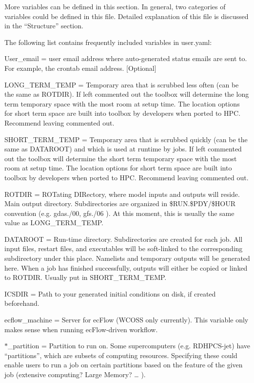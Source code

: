 More variables can be defined in this section. In general, two categories of variables could be defined in this file. Detailed explanation of this file is discussed in the “\-Structure” section.

The following list contains frequently included variables in user.\-yaml\-:


\begin{DoxyItemize}
\item User\-\_\-email = user email address where auto-\/generated status emails are sent to. For example, the crontab email address. \mbox{[}Optional\mbox{]}
\item L\-O\-N\-G\-\_\-\-T\-E\-R\-M\-\_\-\-T\-E\-M\-P = Temporary area that is scrubbed less often (can be the same as R\-O\-T\-D\-I\-R). If left commented out the toolbox will determine the long term temporary space with the most room at setup time. The location options for short term space are built into toolbox by developers when ported to H\-P\-C. Recommend leaving commented out.
\item S\-H\-O\-R\-T\-\_\-\-T\-E\-R\-M\-\_\-\-T\-E\-M\-P = Temporary area that is scrubbed quickly (can be the same as D\-A\-T\-A\-R\-O\-O\-T) and which is used at runtime by jobs. If left commented out the toolbox will determine the short term temporary space with the most room at setup time. The location options for short term space are built into toolbox by developers when ported to H\-P\-C. Recommend leaving commented out.
\item R\-O\-T\-D\-I\-R = R\-O\-Tating D\-I\-Rectory, where model inputs and outputs will reside. Main output directory. Subdirectories are organized in \$\-R\-U\-N.\$\-P\-D\-Y/\$\-H\-O\-U\-R convention (e.\-g. gdas./00, gfs./06 ). At this moment, this is usually the same value as L\-O\-N\-G\-\_\-\-T\-E\-R\-M\-\_\-\-T\-E\-M\-P.
\item D\-A\-T\-A\-R\-O\-O\-T = Run-\/time directory. Subdirectories are created for each job. All input files, restart files, and executables will be soft-\/linked to the corresponding subdirectory under this place. Namelists and temporary outputs will be generated here. When a job has finished successfully, outputs will either be copied or linked to R\-O\-T\-D\-I\-R. Usually put in S\-H\-O\-R\-T\-\_\-\-T\-E\-R\-M\-\_\-\-T\-E\-M\-P.
\item I\-C\-S\-D\-I\-R = Path to your generated initial conditions on disk, if created beforehand.
\item ecflow\-\_\-machine = Server for ec\-Flow (W\-C\-O\-S\-S only currently). This variable only makes sense when running ec\-Flow-\/driven workflow.
\item $\ast$\-\_\-partition = Partition to run on. Some supercomputers (e.\-g. R\-D\-H\-P\-C\-S-\/jet) have “partitions”, which are subsets of computing resources. Specifying these could enable users to run a job on certain partitions based on the feature of the given job (extensive computing? Large Memory? … ).
\end{DoxyItemize}

